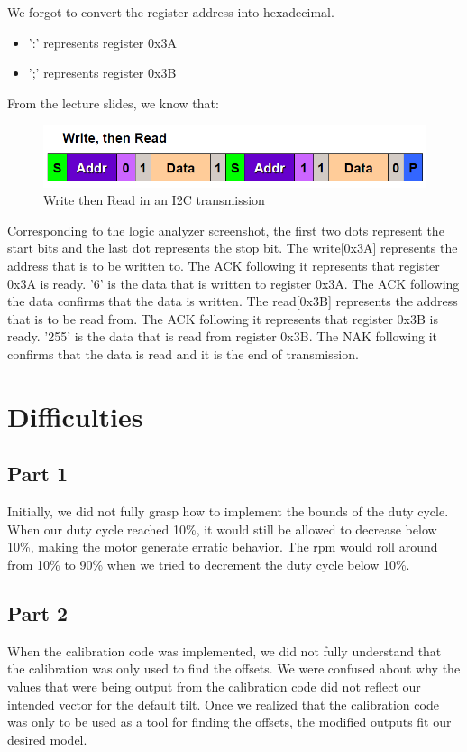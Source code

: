 \documentclass[11pt, titlepage]{article}
\begin{document}
        We forgot to convert the register address into hexadecimal.
        \begin{itemize}
            \item ':' represents register 0x3A
            \item ';' represents register 0x3B 
        \end{itemize}
        From the lecture slides, we know that:
        \FloatBarrier
        \begin{figure}[htbp]
            \centering
            \includegraphics[scale=0.8]{Screenshot/Lecture_I2C.png}
            \caption{Write then Read in an I2C transmission}
        \end{figure}
        Corresponding to the logic analyzer screenshot, the first two dots represent the start bits and the last dot represents the stop bit. The write[0x3A] represents the address that is to be written to. The ACK following it represents that register 0x3A is ready. '6' is the data that is written to register 0x3A. The ACK following the data confirms that the data is written. The read[0x3B] represents the address that is to be read from. The ACK following it represents that register 0x3B is ready. '255' is the data that is read from register 0x3B. The NAK following it confirms that the data is read and it is the end of transmission.
    \section{Difficulties}
        \subsection{Part 1}
            Initially, we did not fully grasp how to implement the bounds of the duty cycle. When our duty cycle reached 10\%, it would still be allowed to decrease below 10\%, making the motor generate erratic behavior. The rpm would roll around from 10\% to 90\% when we tried to decrement the duty cycle below 10\%.
        \subsection{Part 2}
            When the calibration code was implemented, we did not fully understand that the calibration was only used to find the offsets. We were confused about why the values that were being output from the calibration code did not reflect our intended vector for the default tilt. Once we realized that the calibration code was only to be used as a tool for finding the offsets, the modified outputs fit our desired model.
\end{document}
